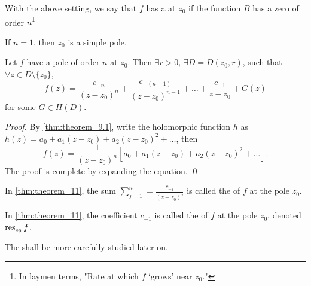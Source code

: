 \documentclass[11pt, oneside]{book}
\begin{document}
\begin{defn}\label{defn:pole_of_order_n_&_simple_pole}
	With the above setting, we say that $f$ has a  at $z_0$ if the function $B$ has a zero of order $n$\footnote{In laymen terms, "Rate at which $f$ `grows' near $z_0$."}

	If $n = 1$, then $z_0$ is a simple pole.
\end{defn}

\begin{thm}[Theorem 11]\label{thm:theorem_11}
	Let $f$ have a pole of order $n$ at $z_0$. Then $\exists r > 0, \, \exists D = D(z_0, r)$, such that $\forall z \in D \setminus \{z_0\}$,
	\begin{equation*}
		f(z) = \frac{c_{-n}}{(z - z_0)^n} + \frac{c_{-(n - 1)}}{(z - z_0)^{n - 1}} + \hdots + \frac{c_{-1}}{z - z_0} + G(z)
	\end{equation*}
	for some $G \in H(D)$.
\end{thm}

\begin{proof}
	By \cref{thm:theorem_9.1}, write the holomorphic function $h$ as $h(z) = a_0 + a_1 (z - z_0) + a_2 (z - z_0)^2 + \hdots$, then
	\begin{equation*}
		f(z) = \frac{1}{(z - z_0)^n} \left[ a_0 + a_1 (z - z_0) + a_2 (z - z_0)^2 + \hdots \right].
	\end{equation*}
	The proof is complete by expanding the equation. \qed
\end{proof}

\begin{defn}\label{defn:principal_part}
	In \cref{thm:theorem_11}, the sum $\sum_{j=1}^{n} = \frac{c_{-j}}{(z - z_0)^j}$ is called the  of $f$ at the pole $z_0$.
\end{defn}

\begin{defn}[Residue]\label{defn:residue}
	In \cref{thm:theorem_11}, the coefficient $c_{-1}$ is called the  of $f$ at the pole $z_0$, denoted $\res{f}{z_0}$.
\end{defn}

The  shall be more carefully studied later on.


\end{document}
